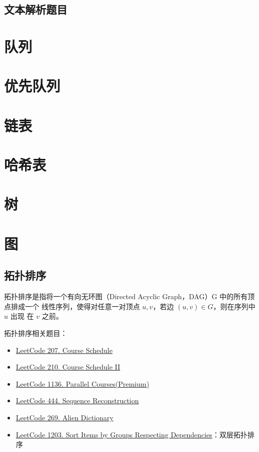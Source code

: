\subsection{文本解析题目}

\section{队列}

\section{优先队列}

\section{链表}

\section{哈希表}

\section{树}

\section{图}

\subsection{拓扑排序}
拓扑排序是指将一个有向无环图（Directed Acyclic Graph，DAG）G 中的所有顶点排成一个
线性序列，使得对任意一对顶点 $u, v$，若边 $(u, v) \in G$，则在序列中 $u$ 出现
在 $v$ 之前。

拓扑排序相关题目：
\begin{itemize}
  \item
    \href{https://leetcode.com/problems/course-schedule/}{LeetCode 207. Course Schedule}
  \item
    \href{https://leetcode.com/problems/course-schedule-ii/}{LeetCode 210. Course Schedule II}
  \item
    \href{https://leetcode.com/problems/parallel-courses}{LeetCode 1136. Parallel Courses(Premium)}
  \item
    \href{https://leetcode.com/problems/sequence-reconstruction}{LeetCode 444.
      Sequence Reconstruction}
  \item
    \href{https://leetcode.com/problems/alien-dictionary}{LeetCode 269. Alien Dictionary}
  \item
    \href{https://leetcode.com/problems/sort-items-by-groups-respecting-dependencies/}{LeetCode
      1203. Sort Items by Groups Respecting Dependencies}：双层拓扑排序
\end{itemize}

